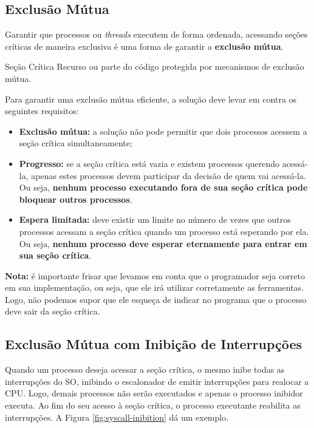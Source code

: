 \subsection{Exclusão Mútua}
Garantir que processos ou \textit{threads} executem de forma ordenada, acessando seções críticas de maneira exclusiva é uma forma de garantir a \textbf{exclusão mútua}.

\begin{definicao}{Seção Crítica}
  Recurso ou parte do código protegida por mecanismos de exclusão mútua.
\end{definicao}

Para garantir uma exclusão mútua eficiente, a solução deve levar em contra os seguintes requisitos:
\begin{itemize}
  \item \textbf{Exclusão mútua:} a solução não pode permitir que dois processos acessem a seção crítica simultaneamente;

  \item \textbf{Progresso:} se a seção crítica está vazia e existem processos querendo acessá-la, apenas estes processos devem participar da decisão de quem vai acessá-la. Ou seja, \textbf{nenhum processo executando fora de sua seção crítica pode bloquear outros processos}.

  \item \textbf{Espera limitada:} deve existir um limite no número de vezes que outros processos acessam a seção crítica quando um processo está esperando por ela. Ou seja, \textbf{nenhum processo deve esperar eternamente para entrar em sua seção crítica}.
\end{itemize}

\textbf{Nota:} é importante frisar que levamos em conta que o programador seja correto em sua implementação, ou seja, que ele irá utilizar corretamente as ferramentas. Logo, não podemos supor que ele esqueça de indicar no programa que o processo deve sair da seção crítica.




\subsection{Exclusão Mútua com Inibição de Interrupções}
Quando um processo deseja acessar a seção crítica, o mesmo inibe todas as interrupções do SO, inibindo o escalonador de emitir interrupções para realocar a CPU. Logo, demais processos não serão executados e apenas o processo inibidor executa. Ao fim do seu acesso à seção crítica, o processo executante reabilita as interrupções. A Figura \ref{fig:syscall-inibition} dá um exemplo.

